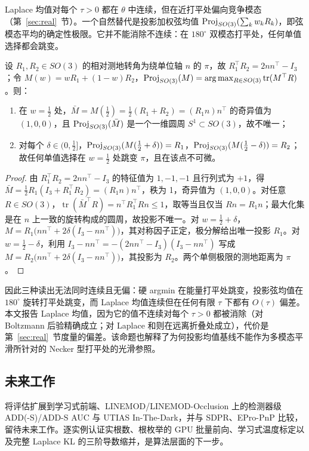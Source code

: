 Laplace 均值对每个 $\tau>0$ 都在 $\theta$ 中连续，但在近打平处偏向竞争模态（第~\ref{sec:real}~节）。一个自然替代是投影加权弦均值 $\operatorname{Proj}_{SO(3)}(\sum_kw_kR_k)$，即弦模态平均的确定性极限。它并不能消除不连续：在 $180^\circ$ 双模态打平处，任何单值选择都会跳变。

\begin{proposition}\label{prop:chordal}
设 $R_1,R_2\in SO(3)$ 的相对测地转角为绕单位轴 $n$ 的 $\pi$，故 $R_1^\top R_2=2nn^\top-I_3$；令 $M(w)=wR_1+(1-w)R_2$，$\operatorname{Proj}_{SO(3)}(M)=\arg\max_{R\in SO(3)}\operatorname{tr}(M^\top R)$。则：
\begin{enumerate}
\item 在 $w=\frac12$ 处，$\bar M=M(\frac12)=\frac12(R_1+R_2)=(R_1n)n^\top$ 的奇异值为 $(1,0,0)$，且 $\operatorname{Proj}_{SO(3)}(\bar M)$ 是一个一维圆周 $S^1\subset SO(3)$，故不唯一；
\item 对每个 $\delta\in(0,\frac12]$，$\operatorname{Proj}_{SO(3)}(M(\frac12+\delta))=R_1$，$\operatorname{Proj}_{SO(3)}(M(\frac12-\delta))=R_2$；故任何单值选择在 $w=\frac12$ 处跳变 $\pi$，且在该点不可微。
\end{enumerate}
\end{proposition}

\begin{proof}
由 $R_1^\top R_2=2nn^\top-I_3$ 的特征值为 $1,-1,-1$ 且行列式为 $+1$，得 $\bar M=\frac12R_1(I_3+R_1^\top R_2)=(R_1n)n^\top$，秩为 1，奇异值为 $(1,0,0)$。对任意 $R\in SO(3)$，$\operatorname{tr}(\bar M^\top R)=n^\top R_1^\top Rn\le1$，取等当且仅当 $Rn=R_1n$；最大化集是在 $n$ 上一致的旋转构成的圆周，故投影不唯一。对 $w=\frac12+\delta$，$M=R_1\big(nn^\top+2\delta(I_3-nn^\top)\big)$，其对称因子正定，极分解给出唯一投影 $R_1$。对 $w=\frac12-\delta$，利用 $I_3-nn^\top=-(2nn^\top-I_3)(I_3-nn^\top)$ 写成 $M=R_2\big(nn^\top+2\delta(I_3-nn^\top)\big)$，其投影为 $R_2$。两个单侧极限的测地距离为 $\pi$。
\end{proof}

因此三种读出无法同时连续且无偏：硬 argmin 在能量打平处跳变，投影弦均值在 $180^\circ$ 旋转打平处跳变，而 Laplace 均值连续但在任何有限 $\tau$ 下都有 $O(\tau)$ 偏差。本文报告 Laplace 均值，因为它的值不连续对每个 $\tau>0$ 都被消除（对 Boltzmann 后验精确成立；对 Laplace 和则在远离折叠处成立），代价是第~\ref{sec:real}~节度量的偏差。该命题也解释了为何投影均值基线不能作为多模态平滑所针对的 Necker 型打平处的光滑参照。

\subsection{未来工作}

将评估扩展到学习式前端、LINEMOD/LINEMOD-Occlusion 上的检测器级 ADD(-S)/ADD-S AUC 与 UTIAS In-The-Dark，并与 SDPR、EPro-PnP 比较，留待未来工作。逐实例认证实根数、根枚举的 GPU 批量前向、学习式温度标定以及完整 Laplace KL 的三阶导数缩并，是算法层面的下一步。
